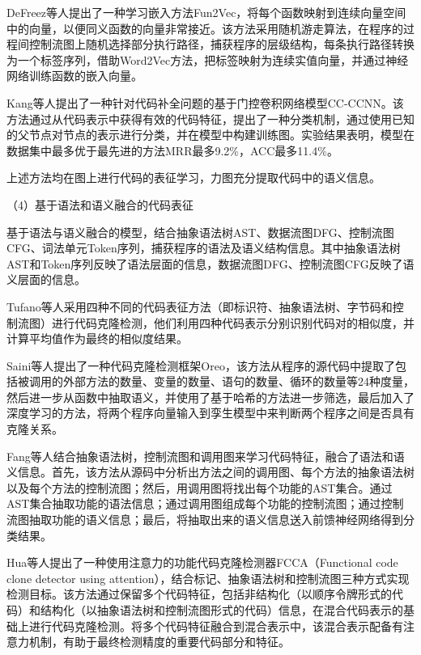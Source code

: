 DeFreez等人\cite{10.1145/3236024.3236059}提出了一种学习嵌入方法Fun2Vec，将每个函数映射到连续向量空间中的向量，以便同义函数的向量非常接近。该方法采用随机游走算法，在程序的过程间控制流图上随机选择部分执行路径，捕获程序的层级结构，每条执行路径转换为一个标签序列，借助Word2Vec方法，把标签映射为连续实值向量，并通过神经网络训练函数的嵌入向量。

Kang等人\cite{Yang2021AGS}提出了一种针对代码补全问题的基于门控卷积网络模型CC-CCNN。该方法通过从代码表示中获得有效的代码特征，提出了一种分类机制，通过使用已知的父节点对节点的表示进行分类，并在模型中构建训练图。实验结果表明，模型在数据集中最多优于最先进的方法MRR最多9.2\%，ACC最多11.4\%。

上述方法均在图上进行代码的表征学习，力图充分提取代码中的语义信息。

（4）基于语法和语义融合的代码表征

基于语法与语义融合的模型，结合抽象语法树AST、数据流图DFG、控制流图CFG、词法单元Token序列，捕获程序的语法及语义结构信息。其中抽象语法树AST和Token序列反映了语法层面的信息，数据流图DFG、控制流图CFG反映了语义层面的信息。

Tufano等人\cite{Tufano2018DeepLS}采用四种不同的代码表征方法（即标识符、抽象语法树、字节码和控制流图）进行代码克隆检测，他们利用四种代码表示分别识别代码对的相似度，并计算平均值作为最终的相似度结果。

Saini等人\cite{10.1145/3236024.3236026}提出了一种代码克隆检测框架Oreo，该方法从程序的源代码中提取了包括被调用的外部方法的数量、变量的数量、语句的数量、循环的数量等24种度量，然后进一步从函数中抽取语义，并使用了基于哈希的方法进一步筛选，最后加入了深度学习的方法，将两个程序向量输入到孪生模型中来判断两个程序之间是否具有克隆关系。

Fang等人\cite{Fang2020FunctionalCC}结合抽象语法树，控制流图和调用图来学习代码特征，融合了语法和语义信息。首先，该方法从源码中分析出方法之间的调用图、每个方法的抽象语法树以及每个方法的控制流图；然后，用调用图将找出每个功能的AST集合。通过AST集合抽取功能的语法信息；通过调用图组成每个功能的控制流图；通过控制流图抽取功能的语义信息；最后，将抽取出来的语义信息送入前馈神经网络得到分类结果。

Hua等人\cite{Hua2020FCCAHC}提出了一种使用注意力的功能代码克隆检测器FCCA（Functional code clone detector using attention），结合标记、抽象语法树和控制流图三种方式实现检测目标。该方法通过保留多个代码特征，包括非结构化（以顺序令牌形式的代码）和结构化（以抽象语法树和控制流图形式的代码）信息，在混合代码表示的基础上进行代码克隆检测。将多个代码特征融合到混合表示中，该混合表示配备有注意力机制，有助于最终检测精度的重要代码部分和特征。

